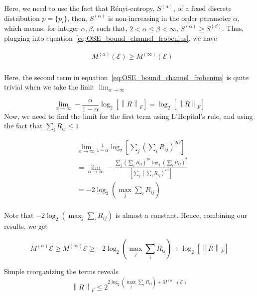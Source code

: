 \documentclass[%
 reprint,
superscriptaddress,
 amsmath,amssymb,
 aps,
]{revtex4-2}
\newcommand{\E}{\mathcal{E}}
\newcommand{\norm}[1]{\left\lVert#1\right\rVert}
\begin{document}
Here, we need to use the fact that Rényi-entropy, $S^{(\alpha)}$, of a fixed discrete distribution $p=\{p_i\}$, then, $S^{(\alpha)}$ is non-increasing in the order parameter $\alpha$, which means, for integer $\alpha, \beta$, such that, $2<\alpha\le\beta<\infty$, $S^{(\alpha)}\ge S^{(\beta)}$. Thus, plugging into equation~\ref{eq:OSE_bound_channel_frobenius}, we have

\begin{equation}
\begin{split}
    &M^{(\alpha)}(\E)\ge M^{(\infty)}(\E)\\
\end{split}
\end{equation}

Here, the second term in equation~\ref{eq:OSE_bound_channel_frobenius} is quite trivial when we take the limit $\lim_{\alpha\rightarrow \infty}$

\begin{equation}
    \lim_{\alpha\rightarrow \infty}-\frac{\alpha}{1-\alpha}\log_2\left[ \norm{R}_F\right]=\log_2\left[ \norm{R}_F\right]
\end{equation}
Now, we need to find the limit for the first term using L'Hopital's rule, and using the fact that $\sum_iR_{ij}\le1$

\begin{equation}
\begin{split}
    &\lim_{\alpha\rightarrow \infty}\frac{1}{1-\alpha} \log_2\left[ \sum_j\left(\sum_i{R_{ij}}\right)^{2\alpha}\right]\\
    &=\lim_{\alpha\rightarrow \infty}-\frac{\sum_j\left(\sum_i R_{ij}\right)^{2\alpha}\log_2\left(\sum_iR_{ij}\right)^2}{\left[ \sum_j\left(\sum_i{R_{ij}}\right)^{2\alpha}\right]}\\
    & = -2\log_2\left(\max_j\sum_iR_{ij}\right)\\
\end{split}
\end{equation}

Note that $-2\log_2\left(\max_j\sum_iR_{ij}\right)$ is almost a constant. Hence, combining our results, we get

\begin{equation}
    M^{(\alpha)}{\E}\ge M^{(\infty)}{\E}\ge -2\log_2\left(\max_j\sum_iR_{ij}\right) + \log_2\left[ \norm{R}_F\right]
\end{equation}

Simple reorganizing the terms reveals
\begin{equation}
 \norm{R}_F \le 2^{2\log_2\left(\max_j\sum_iR_{ij}\right)+M^{(\alpha)}(\E)}
\end{equation}
\end{document}
